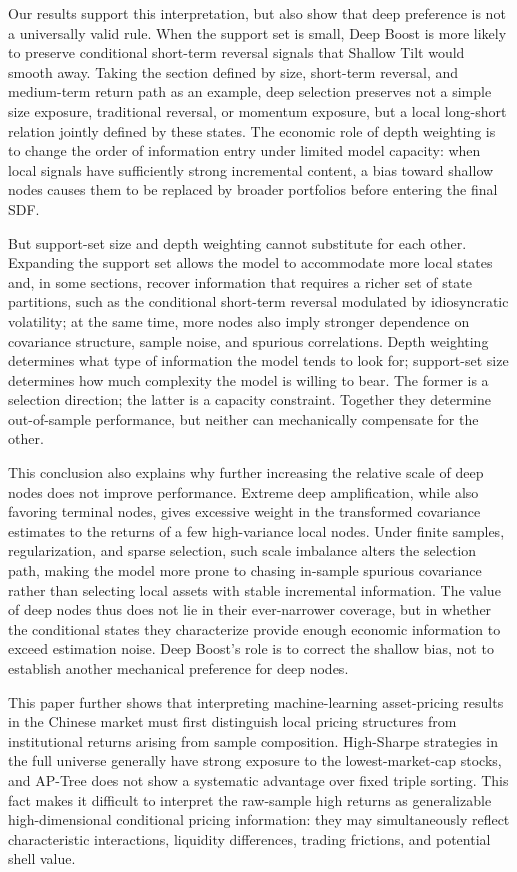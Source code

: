 \documentclass[12pt]{article}
\begin{document}
Our results support this interpretation, but also show that deep preference is not a universally valid rule. When the support set is small, Deep Boost is more likely to preserve conditional short-term reversal signals that Shallow Tilt would smooth away. Taking the section defined by size, short-term reversal, and medium-term return path as an example, deep selection preserves not a simple size exposure, traditional reversal, or momentum exposure, but a local long-short relation jointly defined by these states. The economic role of depth weighting is to change the order of information entry under limited model capacity: when local signals have sufficiently strong incremental content, a bias toward shallow nodes causes them to be replaced by broader portfolios before entering the final SDF.

But support-set size and depth weighting cannot substitute for each other. Expanding the support set allows the model to accommodate more local states and, in some sections, recover information that requires a richer set of state partitions, such as the conditional short-term reversal modulated by idiosyncratic volatility; at the same time, more nodes also imply stronger dependence on covariance structure, sample noise, and spurious correlations. Depth weighting determines what type of information the model tends to look for; support-set size determines how much complexity the model is willing to bear. The former is a selection direction; the latter is a capacity constraint. Together they determine out-of-sample performance, but neither can mechanically compensate for the other.

This conclusion also explains why further increasing the relative scale of deep nodes does not improve performance. Extreme deep amplification, while also favoring terminal nodes, gives excessive weight in the transformed covariance estimates to the returns of a few high-variance local nodes. Under finite samples, regularization, and sparse selection, such scale imbalance alters the selection path, making the model more prone to chasing in-sample spurious covariance rather than selecting local assets with stable incremental information. The value of deep nodes thus does not lie in their ever-narrower coverage, but in whether the conditional states they characterize provide enough economic information to exceed estimation noise. Deep Boost's role is to correct the shallow bias, not to establish another mechanical preference for deep nodes.

This paper further shows that interpreting machine-learning asset-pricing results in the Chinese market must first distinguish local pricing structures from institutional returns arising from sample composition. High-Sharpe strategies in the full universe generally have strong exposure to the lowest-market-cap stocks, and AP-Tree does not show a systematic advantage over fixed triple sorting. This fact makes it difficult to interpret the raw-sample high returns as generalizable high-dimensional conditional pricing information: they may simultaneously reflect characteristic interactions, liquidity differences, trading frictions, and potential shell value.
\end{document}
